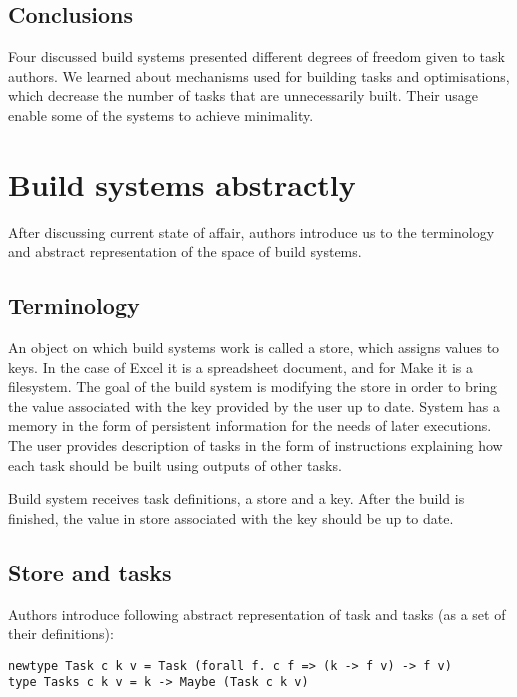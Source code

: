 \subsection{Conclusions}

Four discussed build systems presented different degrees of freedom given to task authors. We learned about mechanisms used for building tasks and optimisations, which decrease the number of tasks that are unnecessarily built. Their usage enable some of the systems to achieve minimality.

\section{Build systems abstractly}

After discussing current state of affair, authors introduce us to the terminology and abstract representation of the space of build systems.

\subsection{Terminology}

An object on which build systems work is called a store, which assigns values to keys. In the case of Excel it is a spreadsheet document, and for Make it is a filesystem. The goal of the build system is modifying the store in order to bring the value associated with the key provided by the user up to date. System has a memory in the form of persistent information for the needs of later executions. The user provides description of tasks in the form of instructions explaining how each task should be built using outputs of other tasks.

Build system receives task definitions, a store and a key. After the build is finished, the value in store associated with the key should be up to date.

\subsection{Store and tasks}

\lstset{style=haskell-style}

Authors introduce following abstract representation of task and tasks (as a set of their definitions):

\begin{lstlisting}
newtype Task c k v = Task (forall f. c f => (k -> f v) -> f v)
type Tasks c k v = k -> Maybe (Task c k v)
\end{lstlisting}

